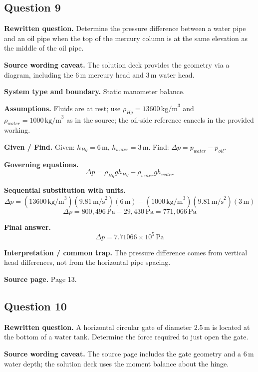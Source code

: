 \subsection*{Question 9}
\textbf{Rewritten question.} Determine the pressure difference between a water pipe and an oil pipe when the top of the mercury column is at the same elevation as the middle of the oil pipe.

\textbf{Source wording caveat.} The solution deck provides the geometry via a diagram, including the $6\,\text{m}$ mercury head and $3\,\text{m}$ water head.

\textbf{System type and boundary.} Static manometer balance.

\textbf{Assumptions.} Fluids are at rest; use $\rho_{Hg}=13600\,\text{kg/m}^3$ and $\rho_{water}=1000\,\text{kg/m}^3$ as in the source; the oil-side reference cancels in the provided working.

\textbf{Given / Find.}
Given: $h_{Hg}=6\,\text{m}$, $h_{water}=3\,\text{m}$.
Find: $\Delta p=p_{water}-p_{oil}$.

\textbf{Governing equations.}
\[
\Delta p=\rho_{Hg}gh_{Hg}-\rho_{water}gh_{water}
\]

\textbf{Sequential substitution with units.}
\[
\Delta p=(13600\,\text{kg/m}^3)(9.81\,\text{m/s}^2)(6\,\text{m})-(1000\,\text{kg/m}^3)(9.81\,\text{m/s}^2)(3\,\text{m})
\]
\[
\Delta p=800{,}496\,\text{Pa}-29{,}430\,\text{Pa}=771{,}066\,\text{Pa}
\]

\textbf{Final answer.}
\[
\boxed{\Delta p=7.71066\times10^5\,\text{Pa}}
\]

\textbf{Interpretation / common trap.} The pressure difference comes from vertical head differences, not from the horizontal pipe spacing.

\textbf{Source page.} Page 13.

\subsection*{Question 10}
\textbf{Rewritten question.} A horizontal circular gate of diameter $2.5\,\text{m}$ is located at the bottom of a water tank. Determine the force required to just open the gate.

\textbf{Source wording caveat.} The source page includes the gate geometry and a $6\,\text{m}$ water depth; the solution deck uses the moment balance about the hinge.

